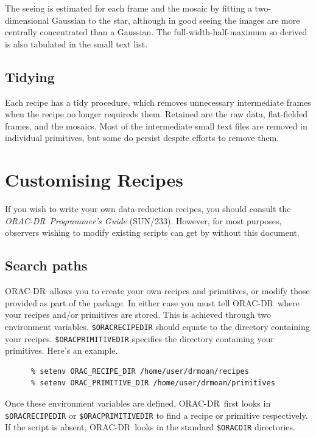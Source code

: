 \documentclass[twoside,11pt]{article}
\newcommand{\xref}[3]{#1}
\newcommand{\xlabel}[1]{}
\renewcommand{\_}{\texttt{\symbol{95}}}
\newcommand{\ORACDR}{{\footnotesize ORAC-DR}}
\begin{document}
The seeing is estimated for each frame and the mosaic by fitting a
two-dimensional Gaussian to the star, although in good seeing the
images are more centrally concentrated than a Gaussian.  The
full-width-half-maximum so derived is also tabulated in the small text
list.

\subsection{\xlabel{tidying}Tidying\label{tidying}}

Each recipe has a tidy procedure, which removes unnecessary
intermediate frames when the recipe no longer requireds them. Retained
are the raw data, flat-fielded frames, and the mosaics.  Most of the
intermediate small text files are removed in individual primitives,
but some do persist despite efforts to remove them.

\section{\xlabel{customising_recipes}Customising
Recipes\label{customising_recipes}}

If you wish to write your own data-reduction recipes, you should
consult the {\em \ORACDR\ Programmer's Guide\/}
(\xref{SUN/233}{sun233}{}).  However, for most purposes, observers
wishing to modify existing scripts can get by without this document.

\subsection{\xlabel{search_paths}Search paths\label{search_paths}}

\ORACDR\ allows you to create your own recipes and primitives, or
modify those provided as part of the package.  In either case you must
tell \ORACDR\ where your recipes and/or primitives are stored.  This
is achieved through two environment variables.  {\tt\$ORAC\_RECIPE\_DIR}
should equate to the directory containing your recipes.
{\tt \$ORAC\_PRIMITIVE\_DIR} specifies the directory containing your
primitives.  Here's an example.

\begin{verbatim}
      % setenv ORAC_RECIPE_DIR /home/user/drmoan/recipes
      % setenv ORAC_PRIMITIVE_DIR /home/user/drmoan/primitives
\end{verbatim}

Once these environment variables are defined, \ORACDR\ first looks in
{\tt \$ORAC\_RECIPE\_DIR} or {\tt \$ORAC\_PRIMITIVE\_DIR} to find a recipe or
primitive respectively.  If the script is absent, \ORACDR\ looks in
the standard {\tt \$ORAC\_DIR} directories.
\end{document}
